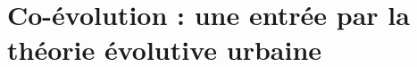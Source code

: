 



\chapter[Théorie Evolutive Urbaine]{Co-évolution : une entrée par la théorie évolutive urbaine}

\label{ch:evolutiveurban} %












